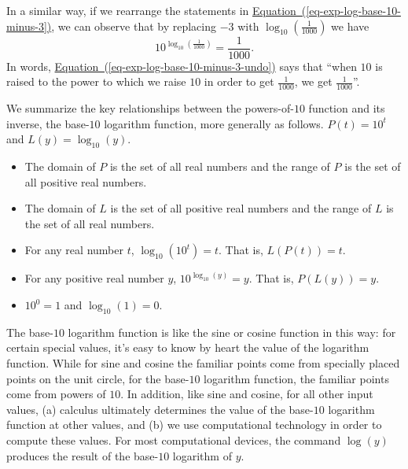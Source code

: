 \documentclass[nooutcomes]{ximera}
\begin{document}
In a similar way, if we rearrange the statements in \hyperref[eq-exp-log-base-10-minus-3]{Equation~(\ref{eq-exp-log-base-10-minus-3})}, we can observe that by replacing \(-3\) with \(\log_{10}(\frac{1}{1000})\) we have%
\begin{equation}
10^{\log_{10}(\frac{1}{1000})} = \frac{1}{1000}\text{.}\label{eq-exp-log-base-10-minus-3-undo}
\end{equation}
In words, \hyperref[eq-exp-log-base-10-minus-3-undo]{Equation~(\ref{eq-exp-log-base-10-minus-3-undo})} says that ``when \(10\) is raised to the power to which we raise \(10\) in order to get \(\frac{1}{1000}\), we get \(\frac{1}{1000}\)''.%

We summarize the key relationships between the powers-of-\(10\) function and its inverse, the base-\(10\) logarithm function, more generally as follows.%
{\(P(t) = 10^t\) and \(L(y) = \log_{10}(y)\).}
\begin{itemize}[label=\textbullet]
\item
The domain of \(P\) is the set of all real numbers and the range of \(P\) is the set of all positive real numbers.%
\item
The domain of \(L\) is the set of all positive real numbers and the range of \(L\) is the set of all real numbers.%
\item
For any real number \(t\), \(\log_{10}(10^t) = t\).  That is, \(L(P(t)) = t\).%
\item
For any positive real number \(y\), \(10^{\log_{10}(y)} = y\).  That is, \(P(L(y)) = y\).%
\item
\(10^0 = 1\) and \(\log_{10}(1) = 0\).%
\end{itemize}

The base-\(10\) logarithm function is like the sine or cosine function in this way:  for certain special values, it's easy to know by heart the value of the logarithm function.  While for sine and cosine the familiar points come from specially placed points on the unit circle, for the base-\(10\) logarithm function, the familiar points come from powers of \(10\). In addition, like sine and cosine, for all other input values, (a) calculus ultimately determines the value of the base-\(10\) logarithm function at other values, and (b) we use computational technology in order to compute these values.  For most computational devices, the command $\log(y)$ produces the result of the base-\(10\) logarithm of \(y\).%
\end{document}
